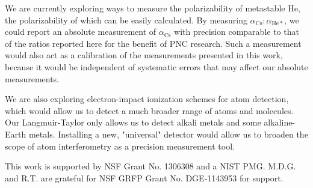 \documentclass[twocolumn,prl,showpacs,superscriptaddress]{revtex4-1}   %
\newcommand{\acs}{\alpha_{\textrm{Cs}}}
\begin{document}
We are currently exploring ways to measure the polarizability of metastable He, the polarizability of which can be easily calculated. By measuring $\acs:\alpha_{\mathrm{He*}}$, we could report an absolute measurement of $\acs$ with precision comparable to that of the ratios reported here for the benefit of PNC research. Such a measurement would also act as a calibration of the measurements presented in this work, because it would be independent of systematic errors that may affect our absolute measurements.

We are also exploring electron-impact ionization schemes for atom detection, which would allow us to detect a much broader range of atoms and molecules. Our Langmuir-Taylor only allows us to detect alkali metals and some alkaline-Earth metals. Installing a new, "universal" detector would allow us to broaden the scope of atom interferometry as a precision measurement tool. 

This work is supported by NSF Grant No. 1306308 and a NIST PMG. M.D.G. and R.T. are grateful for NSF GRFP Grant No. DGE-1143953 for support. 


%

\end{document}
